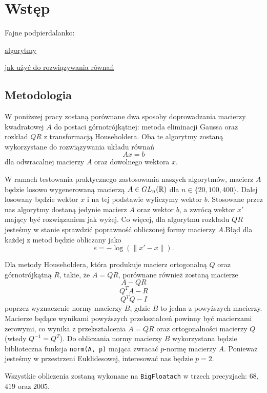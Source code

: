 \section{Wstęp}

Fajne podpierdalanko:

\href{https://people.inf.ethz.ch/gander/papers/qrneu.pdf}{algorytmy}

\href{https://inst.eecs.berkeley.edu/~ee127/sp21/livebook/l_lineqs_solving.html}{jak użyć do rozwiązywania równań}

\subsection{Metodologia}

W poniższej pracy zostaną porównane dwa sposoby doprowadzania macierzy kwadratowej $A$ do postaci górnotrójkątnej: metoda eliminacji Gaussa oraz rozkład $QR$ z transformacją Householdera. Oba te algorytmy zostaną wykorzystane do rozwiązywania układu równań 
$$Ax=b$$
dla odwracalnej macierzy $A$ oraz dowolnego wektora $x$.

W ramach testowania praktycznego zastosowania naszych algorytmów, macierz $A$ będzie losowo wygenerowaną macierzą $A\in GL_n(\mathbb{R})$ dla $n\in\{20,100,400\}$. Dalej losowany będzie wektor $x$ i na tej podstawie wyliczymy wektor $b$. Stosowane przez nas algorytmy dostaną jedynie macierz $A$ oraz wektor $b$, a zwrócą wektor $x'$ mający być rozwiązaniem jak wyżej. Co więcej, dla algorytmu rozkładu $QR$ jesteśmy w stanie sprawdzić poprawność obliczonej formy macierzy $A$.Błąd dla każdej z metod będzie obliczany jako
$$e=-\log(\|x'-x\|).$$

Dla metody Householdera, która produkuje macierz ortogonalną $Q$ oraz górnotrójkątną $R$, takie, że $A=QR$, porównane również zostaną macierze
$$A-QR$$
$$Q^TA-R$$
$$Q^TQ-I$$
poprzez wyznaczenie normy macierzy $B$, gdzie $B$ to jedna z powyższych macierzy. Macierze będące wynikami powyższych przekształceń powinny być macierzami zerowymi, co wynika z przekształcenia $A=QR$ oraz ortogonalności macierzy $Q$ (wtedy $Q^{-1}=Q^T$). Do obliczania normy macierzy $B$ wykorzystana będzie biblioteczna funkcja \verb+norm(A, p)+ mająca zwracać $p$-normę macierzy $A$. Ponieważ jesteśmy w przestrzeni Euklidesowej, interesować nas będzie $p=2$. 

Wszystkie obliczenia zostaną wykonane na \verb+BigFloatach+ w trzech precyzjach: $68$, $419$ oraz $2005$.